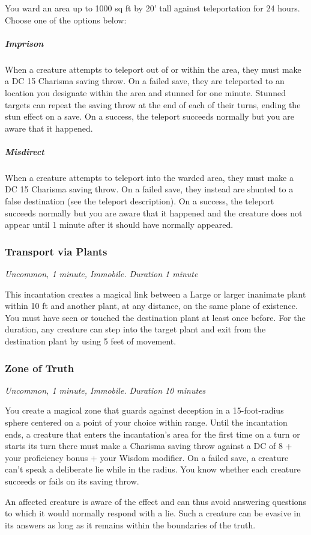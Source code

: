 You ward an area up to 1000 sq ft by 20' tall against teleportation for 24 hours. Choose one of the options below:
\subparagraph*{Imprison} When a creature attempts to teleport out of or within the area, they must make a DC 15 Charisma saving throw. On a failed save, they are teleported to an location you designate within the area and stunned for one minute. Stunned targets can repeat the saving throw at the end of each of their turns, ending the stun effect on a save. On a success, the teleport succeeds normally but you are aware that it happened.

\subparagraph*{Misdirect} When a creature attempts to teleport into the warded area, they must make a DC 15 Charisma saving throw. On a failed save, they instead are shunted to a false destination (see the teleport description). On a success, the teleport succeeds normally but you are aware that it happened and the creature does not appear until 1 minute after it should have normally appeared.

\subsubsection{Transport via Plants}
\textit{Uncommon, 1 minute, Immobile. Duration 1 minute}

This incantation creates a magical link between a Large or larger inanimate plant within 10 ft and another plant, at any distance, on the same plane of existence. You must have seen or touched the destination plant at least once before. For the duration, any creature can step into the target plant and exit from the destination plant by using 5 feet of movement.

\subsubsection{Zone of Truth}
\textit{Uncommon, 1 minute, Immobile. Duration 10 minutes}

You create a magical zone that guards against deception in a 15-foot-radius sphere centered on a point of your choice within range. Until the incantation ends, a creature that enters the incantation's area for the first time on a turn or starts its turn there must make a Charisma saving throw against a DC of 8 + your proficiency bonus + your Wisdom modifier. On a failed save, a creature can't speak a deliberate lie while in the radius. You know whether each creature succeeds or fails on its saving throw.

An affected creature is aware of the effect and can thus avoid answering questions to which it would normally respond with a lie. Such a creature can be evasive in its answers as long as it remains within the boundaries of the truth.

